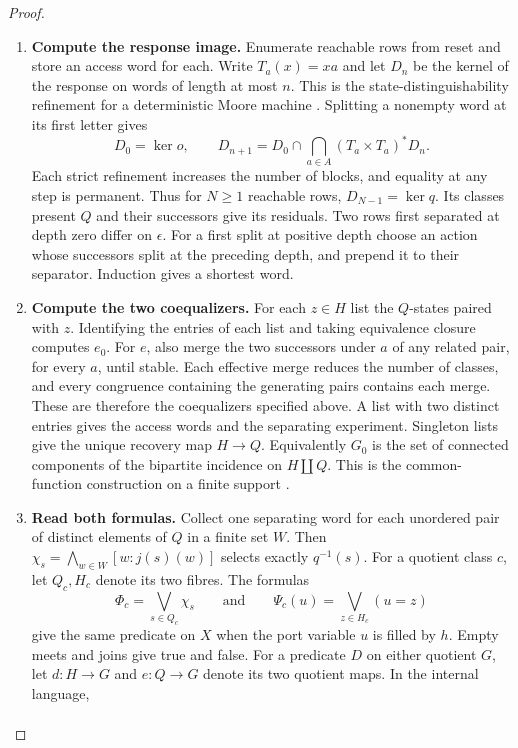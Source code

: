 \documentclass[11pt,a4paper]{article}
\theoremstyle{definition}
\theoremstyle{remark}\newaliascnt{remark}{theorem}
\numberwithin{equation}{section}
\begin{document}
\begin{proof}\leavevmode
\begin{enumerate}[titledsteps]
\item \textbf{Compute the response image.} Enumerate reachable rows from reset and store an access word for each. Write $T_a(x)=xa$ and let $D_n$ be the kernel of the response on words of length at most $n$. This is the state-distinguishability refinement for a deterministic Moore machine \cite{moore}. Splitting a nonempty word at its first letter gives
\[
 D_0=\ker o,\qquad D_{n+1}=D_0\cap\bigcap_{a\in A}(T_a\times T_a)^*D_n.
\]
Each strict refinement increases the number of blocks, and equality at any step is permanent. Thus for $N\ge1$ reachable rows, $D_{N-1}=\ker q$. Its classes present $Q$ and their successors give its residuals. Two rows first separated at depth zero differ on $\epsilon$. For a first split at positive depth choose an action whose successors split at the preceding depth, and prepend it to their separator. Induction gives a shortest word.
\item \textbf{Compute the two coequalizers.} For each $z\in H$ list the $Q$-states paired with $z$. Identifying the entries of each list and taking equivalence closure computes $e_0$. For $e$, also merge the two successors under $a$ of any related pair, for every $a$, until stable. Each effective merge reduces the number of classes, and every congruence containing the generating pairs contains each merge. These are therefore the coequalizers specified above. A list with two distinct entries gives the access words and the separating experiment. Singleton lists give the unique recovery map $H\to Q$. Equivalently $G_0$ is the set of connected components of the bipartite incidence on $H\amalg Q$. This is the common-function construction on a finite support \cite{ground-common-information}.
\item \textbf{Read both formulas.} Collect one separating word for each unordered pair of distinct elements of $Q$ in a finite set $W$. Then $\chi_s=\bigwedge_{w\in W}[w:j(s)(w)]$ selects exactly $q^{-1}(s)$. For a quotient class $c$, let $Q_c,H_c$ denote its two fibres. The formulas
\[
             \Phi_c=\bigvee_{s\in Q_c}\chi_s
          \qquad\text{and}\qquad
             \Psi_c(u)=\bigvee_{z\in H_c}(u=z)
\]
give the same predicate on $X$ when the port variable $u$ is filled by $h$. Empty meets and joins give true and false. For a predicate $D$ on either quotient $G$, let $d:H\to G$ and $e:Q\to G$ denote its two quotient maps. In the internal language,
\[
 \begin{aligned}

\end{aligned}\]
\end{enumerate}
\end{proof}
\end{document}
